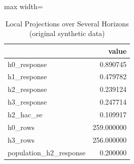 \begin{table}[htbp]
\centering
\caption{Local Projections over Several Horizons (original synthetic data)}
\begingroup
\small
\setlength{\tabcolsep}{6pt}
\renewcommand{\arraystretch}{1.12}
\begin{adjustbox}{max width=\linewidth}
\begin{tabular}{@{}lr@{}}
\toprule
 & value \\
\midrule
h0\_response & 0.890745 \\
h1\_response & 0.479782 \\
h2\_response & 0.239124 \\
h3\_response & 0.247714 \\
h2\_hac\_se & 0.109917 \\
h0\_rows & 259.000000 \\
h3\_rows & 256.000000 \\
population\_h2\_response & 0.200000 \\
\bottomrule
\end{tabular}
\end{adjustbox}
\endgroup
\end{table}